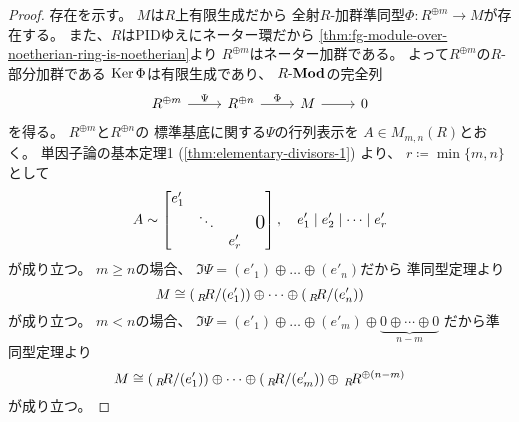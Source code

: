 \documentclass[report]{jlreq}
\begin{document}
\begin{proof}
    存在を示す。
    $M$は$R$上有限生成だから
    全射$R$-加群準同型$\Phi \colon R^{\oplus m} \to M$が存在する。
    また、$R$はPIDゆえにネーター環だから
    \cref{thm:fg-module-over-noetherian-ring-is-noetherian}より
    $R^{\oplus m}$はネーター加群である。
    よって$R^{\oplus m}$の$R$-部分加群である
    $\operatorname{\mathrm{Ker}} \Phi$は有限生成であり、
    $R\text{-}\mathbf{Mod}$の完全列
    \begin{equation}
        \begin{tikzcd}
            R^{\oplus m}
                \ar{r}{\Psi}
                & R^{\oplus n}
                    \ar{r}{\Phi}
                & M
                    \ar{r}
                & 0
        \end{tikzcd}
    \end{equation}
    を得る。
    $R^{\oplus m}$と$R^{\oplus n}$の
    標準基底に関する$\Psi$の行列表示を
    $A \in M_{m, n}(R)$とおく。
    単因子論の基本定理1 (\cref{thm:elementary-divisors-1}) より、
    $r \coloneqq \min\{m, n\}$として
    \begin{equation}
        A \sim \begin{bmatrix}
            e'_1 \\
            & \ddots & & \text{\Large $0$} \\
            && e'_r
        \end{bmatrix},
        \quad
        e'_1 \mid e'_2 \mid \cdots \mid e'_r
    \end{equation}
    が成り立つ。
    $m \ge n$の場合、
    $\Im \Psi = (e'_1) \oplus \dots \oplus (e'_n)$だから
    準同型定理より
    \begin{equation}
        M \cong (\,{}_{R}\!R / (e'_1)) \oplus \dots \oplus (\,{}_{R}\!R / (e'_n))
    \end{equation}
    が成り立つ。
    $m < n$の場合、
    $\Im \Psi
        = (e'_1) \oplus \dots \oplus (e'_m)
        \oplus \underbrace{0 \oplus \cdots \oplus 0}_{n - m}$
    だから準同型定理より
    \begin{equation}
        M \cong (\,{}_{R}\!R / (e'_1)) \oplus \dots \oplus (\,{}_{R}\!R / (e'_m))
            \oplus \,{}_{R}\!R^{\oplus (n - m)}
    \end{equation}
    が成り立つ。

    \TODO{}
\end{proof}

\begin{corollary}[有限生成アーベル群の場合]
    \TODO{}
\end{corollary}
\end{document}

